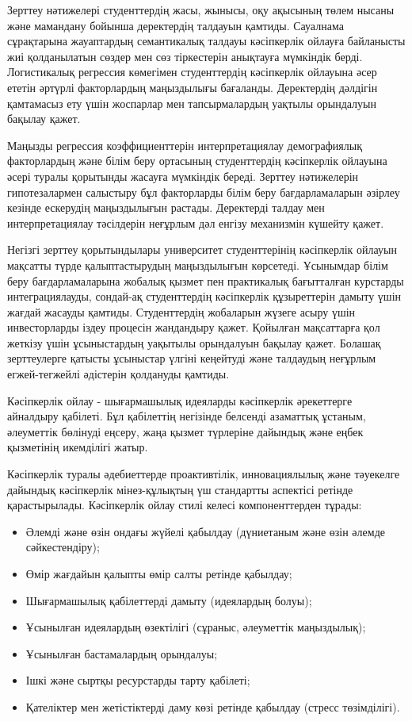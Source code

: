 \begin{multicols}{2}
Зерттеу нәтижелері студенттердің жасы, жынысы, оқу ақысының төлем нысаны
және мамандану бойынша деректердің талдауын қамтиды. Сауалнама
сұрақтарына жауаптардың семантикалық талдауы кәсіпкерлік ойлауға
байланысты жиі қолданылатын сөздер мен сөз тіркестерін анықтауға
мүмкіндік берді. Логистикалық регрессия көмегімен студенттердің
кәсіпкерлік ойлауына әсер ететін әртүрлі факторлардың маңыздылығы
бағаланды. Деректердің дәлдігін қамтамасыз ету үшін жоспарлар мен
тапсырмалардың уақтылы орындалуын бақылау қажет.

Маңызды регрессия коэффициенттерін интерпретациялау демографиялық
факторлардың және білім беру ортасының студенттердің кәсіпкерлік
ойлауына әсері туралы қорытынды жасауға мүмкіндік береді. Зерттеу
нәтижелерін гипотезалармен салыстыру бұл факторларды білім беру
бағдарламаларын әзірлеу кезінде ескерудің маңыздылығын растады.
Деректерді талдау мен интерпретациялау тәсілдерін неғұрлым дәл енгізу
механизмін күшейту қажет.

Негізгі зерттеу қорытындылары университет студенттерінің кәсіпкерлік
ойлауын мақсатты түрде қалыптастырудың маңыздылығын көрсетеді. Ұсынымдар
білім беру бағдарламаларына жобалық қызмет пен практикалық бағытталған
курстарды интеграциялауды, сондай-ақ студенттердің кәсіпкерлік
құзыреттерін дамыту үшін жағдай жасауды қамтиды. Студенттердің жобаларын
жүзеге асыру үшін инвесторларды іздеу процесін жандандыру қажет.
Қойылған мақсаттарға қол жеткізу үшін ұсыныстардың уақытылы орындалуын
бақылау қажет. Болашақ зерттеулерге қатысты ұсыныстар үлгіні кеңейтуді
және талдаудың неғұрлым егжей-тегжейлі әдістерін қолдануды қамтиды.

Кәсіпкерлік ойлау - шығармашылық идеяларды кәсіпкерлік әрекеттерге
айналдыру қабілеті. Бұл қабілеттің негізінде белсенді азаматтық ұстаным,
әлеуметтік бөлінуді еңсеру, жаңа қызмет түрлеріне дайындық және еңбек
қызметінің икемділігі жатыр.

Кәсіпкерлік туралы әдебиеттерде проактивтілік, инновациялылық және
тәуекелге дайындық кәсіпкерлік мінез-құлықтың үш стандартты аспектісі
ретінде қарастырылады. Кәсіпкерлік ойлау стилі келесі компоненттерден
тұрады:

\begin{itemize}
\item
  Әлемді және өзін ондағы жүйелі қабылдау (дүниетаным және өзін әлемде
  сәйкестендіру);
\item
  Өмір жағдайын қалыпты өмір салты ретінде қабылдау;
\item
  Шығармашылық қабілеттерді дамыту (идеялардың болуы);
\item
  Ұсынылған идеялардың өзектілігі (сұраныс, әлеуметтік маңыздылық);
\item
  Ұсынылған бастамалардың орындалуы;
\item
  Ішкі және сыртқы ресурстарды тарту қабілеті;
\item
  Қателіктер мен жетістіктерді даму көзі ретінде қабылдау (стресс
  төзімділігі).
\end{itemize}


\end{multicols}
